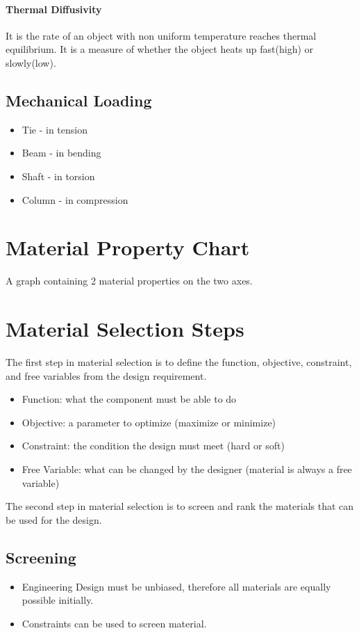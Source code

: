 \documentclass{article}
\begin{document}
    \paragraph*{Thermal Diffusivity\newline}
    It is the rate of an object with non uniform temperature reaches thermal equilibrium. It is a measure of whether the object 
    heats up fast(high) or slowly(low).

    \subsection*{Mechanical Loading}
    \begin{itemize}
        \item Tie - in tension
        \item Beam - in bending
        \item Shaft - in torsion
        \item Column - in compression
    \end{itemize}

    \section*{Material Property Chart}
    A graph containing 2 material properties on the two axes.

    \section*{Material Selection Steps}
    The first step in material selection is to define the function, objective, constraint, and free variables 
    from the design requirement.
    
    \begin{itemize}
        \item Function: what the component must be able to do
        \item Objective: a parameter to optimize (maximize or minimize)
        \item Constraint: the condition the design must meet (hard or soft)
        \item Free Variable: what can be changed by the designer (material is always a free variable)
    \end{itemize}

    The second step in material selection is to screen and rank the materials that can be used for the design.

    \subsection*{Screening}
    \begin{itemize}
        \item Engineering Design must be unbiased, therefore all materials are equally possible initially.
        \item Constraints can be used to screen material.
    \end{itemize}
\end{document}
